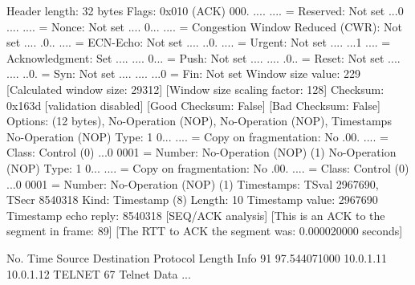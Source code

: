     Header length: 32 bytes
    Flags: 0x010 (ACK)
        000. .... .... = Reserved: Not set
        ...0 .... .... = Nonce: Not set
        .... 0... .... = Congestion Window Reduced (CWR): Not set
        .... .0.. .... = ECN-Echo: Not set
        .... ..0. .... = Urgent: Not set
        .... ...1 .... = Acknowledgment: Set
        .... .... 0... = Push: Not set
        .... .... .0.. = Reset: Not set
        .... .... ..0. = Syn: Not set
        .... .... ...0 = Fin: Not set
    Window size value: 229
    [Calculated window size: 29312]
    [Window size scaling factor: 128]
    Checksum: 0x163d [validation disabled]
        [Good Checksum: False]
        [Bad Checksum: False]
    Options: (12 bytes), No-Operation (NOP), No-Operation (NOP), Timestamps
        No-Operation (NOP)
            Type: 1
                0... .... = Copy on fragmentation: No
                .00. .... = Class: Control (0)
                ...0 0001 = Number: No-Operation (NOP) (1)
        No-Operation (NOP)
            Type: 1
                0... .... = Copy on fragmentation: No
                .00. .... = Class: Control (0)
                ...0 0001 = Number: No-Operation (NOP) (1)
        Timestamps: TSval 2967690, TSecr 8540318
            Kind: Timestamp (8)
            Length: 10
            Timestamp value: 2967690
            Timestamp echo reply: 8540318
    [SEQ/ACK analysis]
        [This is an ACK to the segment in frame: 89]
        [The RTT to ACK the segment was: 0.000020000 seconds]

No.     Time           Source                Destination           Protocol Length Info
     91 97.544071000   10.0.1.11             10.0.1.12             TELNET   67     Telnet Data ...


